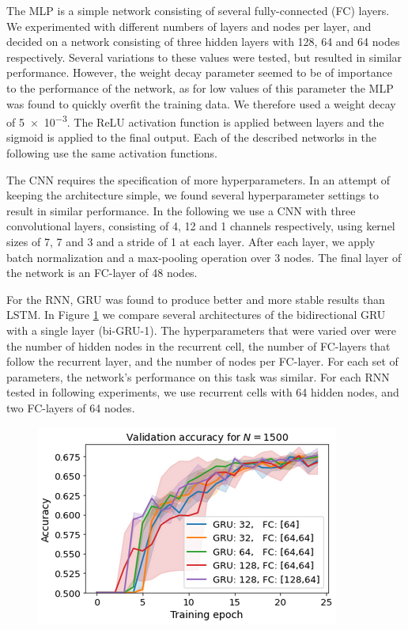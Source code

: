 The MLP is a simple network consisting of several fully-connected (FC) layers. We experimented with different numbers of layers and nodes per layer, and decided on a network consisting of three hidden layers with 128, 64 and 64 nodes respectively. Several variations to these values were tested, but resulted in similar performance. However, the weight decay parameter seemed to be of importance to the performance of the network, as for low values of this parameter the MLP was found to quickly overfit the training data. We therefore used a weight decay of \num{5e-3}. The ReLU activation function is applied between layers and the sigmoid is applied to the final output. Each of the described networks in the following use the same activation functions.

The CNN requires the specification of more hyperparameters. In an attempt of keeping the architecture simple, we found several hyperparameter settings to result in similar performance. In the following we use a CNN with three convolutional layers, consisting of 4, 12 and 1 channels respectively, using kernel sizes of 7, 7 and 3 and a stride of 1 at each layer. After each layer, we apply batch normalization and a max-pooling operation over 3 nodes. The final layer of the network is an FC-layer of 48 nodes. 

For the RNN, GRU was found to produce better and more stable results than LSTM. In Figure \ref{fig:hybrid-gru_architectures} we compare several architectures of the bidirectional GRU with a single layer (bi-GRU-1). The hyperparameters that were varied over were the number of hidden nodes in the recurrent cell, the number of FC-layers that follow the recurrent layer, and the number of nodes per FC-layer. For each set of parameters, the network's performance on this task was similar. For each RNN tested in following experiments, we use recurrent cells with 64 hidden nodes, and two FC-layers of 64 nodes.

\begin{figure}
    \centering
    \includegraphics[width=0.4\linewidth]{Experiments/Figures/Hybrid/hybrid_architectures_identification.png}
    \caption{}
    \label{fig:hybrid-gru_architectures}
\end{figure}


